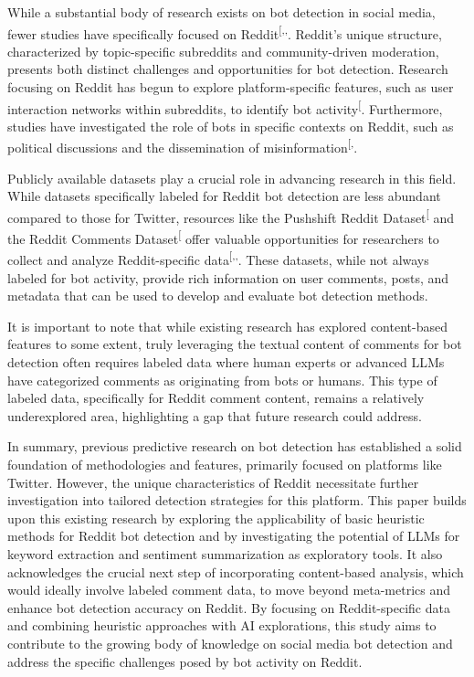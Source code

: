 \documentclass[
  12pt,
  letterpaper,
  DIV=11,
  numbers=noendperiod,
  abstract]{scrartcl}
\begin{document}
While a substantial body of research exists on bot detection in social
media, fewer studies have specifically focused on
Reddit\textsuperscript{{[},,\citeproc{ref-mlredditbots}{15}{]}}.
Reddit's unique structure, characterized by topic-specific subreddits
and community-driven moderation, presents both distinct challenges and
opportunities for bot detection. Research focusing on Reddit has begun
to explore platform-specific features, such as user interaction networks
within subreddits, to identify bot
activity\textsuperscript{{[}\citeproc{ref-redditbotnetwork}{14}{]}}.
Furthermore, studies have investigated the role of bots in specific
contexts on Reddit, such as political discussions and the dissemination
of
misinformation\textsuperscript{{[},\citeproc{ref-multibotdetector}{4}{]}}.

Publicly available datasets play a crucial role in advancing research in
this field. While datasets specifically labeled for Reddit bot detection
are less abundant compared to those for Twitter, resources like the
Pushshift Reddit
Dataset\textsuperscript{{[}\citeproc{ref-pushshiftredditdataset}{16}{]}}
and the Reddit Comments
Dataset\textsuperscript{{[}\citeproc{ref-redditcommentsdataset}{17}{]}}
offer valuable opportunities for researchers to collect and analyze
Reddit-specific
data\textsuperscript{{[},,\citeproc{ref-redditcommentsdataset}{17}{]}}.
These datasets, while not always labeled for bot activity, provide rich
information on user comments, posts, and metadata that can be used to
develop and evaluate bot detection methods.

It is important to note that while existing research has explored
content-based features to some extent, truly leveraging the textual
content of comments for bot detection often requires labeled data where
human experts or advanced LLMs have categorized comments as originating
from bots or humans. This type of labeled data, specifically for Reddit
comment content, remains a relatively underexplored area, highlighting a
gap that future research could address.

In summary, previous predictive research on bot detection has
established a solid foundation of methodologies and features, primarily
focused on platforms like Twitter. However, the unique characteristics
of Reddit necessitate further investigation into tailored detection
strategies for this platform. This paper builds upon this existing
research by exploring the applicability of basic heuristic methods for
Reddit bot detection and by investigating the potential of LLMs for
keyword extraction and sentiment summarization as exploratory tools. It
also acknowledges the crucial next step of incorporating content-based
analysis, which would ideally involve labeled comment data, to move
beyond meta-metrics and enhance bot detection accuracy on Reddit. By
focusing on Reddit-specific data and combining heuristic approaches with
AI explorations, this study aims to contribute to the growing body of
knowledge on social media bot detection and address the specific
challenges posed by bot activity on Reddit.
\end{document}
